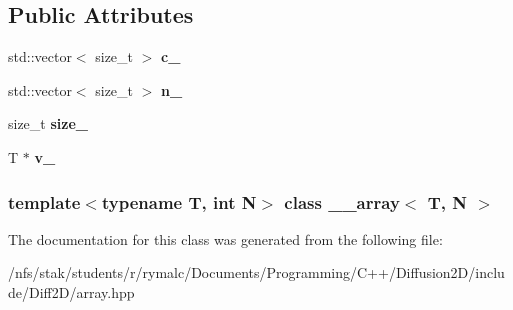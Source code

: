 \subsection*{Public Attributes}
\begin{DoxyCompactItemize}
\item 
\hypertarget{class____array_a3f8bd6c9e9554f032fc9ce51037a9068}{
std::vector$<$ size\_\-t $>$ {\bfseries c\_\-}}
\label{class____array_a3f8bd6c9e9554f032fc9ce51037a9068}

\item 
\hypertarget{class____array_aeeea561b072cbbbcbbf5385fc010ad9c}{
std::vector$<$ size\_\-t $>$ {\bfseries n\_\-}}
\label{class____array_aeeea561b072cbbbcbbf5385fc010ad9c}

\item 
\hypertarget{class____array_a9e84ea9904c281c73d38730bf1c63c6f}{
size\_\-t {\bfseries size\_\-}}
\label{class____array_a9e84ea9904c281c73d38730bf1c63c6f}

\item 
\hypertarget{class____array_acd1bdf7fd0d7c1d9888ec5ab746e4472}{
T $\ast$ {\bfseries v\_\-}}
\label{class____array_acd1bdf7fd0d7c1d9888ec5ab746e4472}

\end{DoxyCompactItemize}
\subsubsection*{template$<$typename T, int N$>$ class \_\-\_\-array$<$ T, N $>$}



The documentation for this class was generated from the following file:\begin{DoxyCompactItemize}
\item 
/nfs/stak/students/r/rymalc/Documents/Programming/C++/Diffusion2D/include/Diff2D/array.hpp\end{DoxyCompactItemize}
